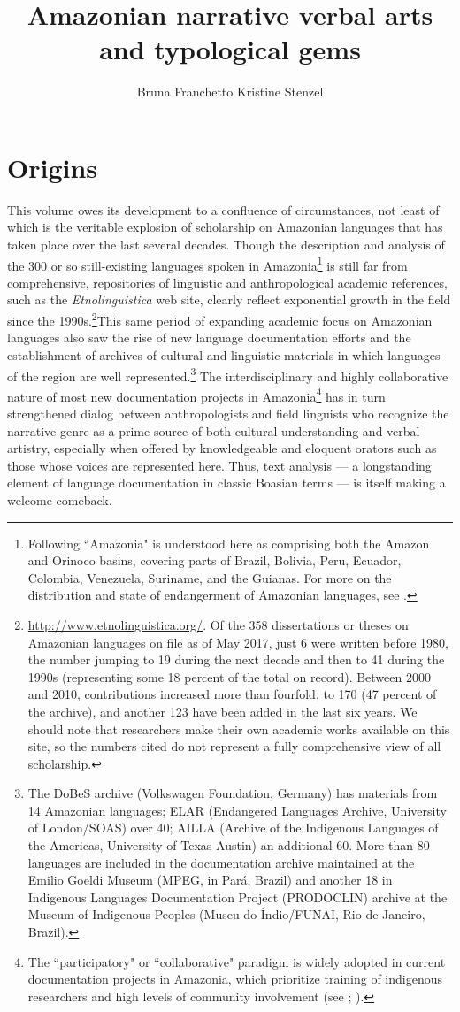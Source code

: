 \documentclass[output=paper,
modfonts,nonflat
]{langsci/langscibook}
\author{Bruna Franchetto\affiliation{Museu Nacional, Federal University of Rio de Janeiro, Brazil}\lastand 
Kristine Stenzel\affiliation{Federal University of Rio de Janeiro, Brazil}
}
\title{Amazonian narrative verbal arts and typological gems}
\begin{document}
  
\section{Origins}
This volume owes its development to a confluence of circumstances, not least of which is the veritable explosion of scholarship on Amazonian languages that has taken place over the last several decades. Though the description and analysis of the 300 or so still-existing languages spoken in Amazonia\footnote{Following \citealt{EppsSal2013} “Amazonia" is understood here as comprising both the Amazon and Orinoco basins, covering parts of Brazil, Bolivia, Peru, Ecuador, Colombia, Venezuela, Suriname, and the Guianas. For more on the distribution and state of endangerment of Amazonian languages, see \citealt{Moore2008}.} is still far from comprehensive, repositories of linguistic and anthropological academic references, such as the \textit{Etnolinguistica} web site, clearly reflect exponential growth in the field since the 1990s.\footnote{\url{http://www.etnolinguistica.org/}. Of the 358 dissertations or theses on Amazonian languages on file as of May 2017, just 6 were written before 1980, the number jumping to 19 during the next decade and then to 41 during the 1990s (representing some 18 percent of the total on record). Between 2000 and 2010, contributions increased more than fourfold, to 170 (47 percent of the archive), and another 123 have been added in the last six years. We should note that researchers make their own academic works available on this site, so the numbers cited do not represent a fully comprehensive view of all scholarship.}This same period of expanding academic focus on Amazonian languages also saw the rise of new language documentation efforts and the establishment of archives of cultural and linguistic materials in which languages of the region are well represented.\footnote{The DoBeS archive (Volkswagen Foundation, Germany) has materials from 14 Amazonian languages; ELAR (Endangered Languages Archive, University of London/SOAS) over 40; AILLA (Archive of the Indigenous Languages of the Americas, University of Texas Austin) an additional 60. More than 80 languages are included in the documentation archive maintained at the Emilio Goeldi Museum (MPEG, in Pará, Brazil) and another 18 in  Indigenous Languages Documentation Project (PRODOCLIN) archive at the Museum of Indigenous Peoples (Museu do Índio/FUNAI, Rio de Janeiro, Brazil).}
The interdisciplinary and highly collaborative nature of most new documentation projects in Amazonia\footnote{The “participatory" or “collaborative" paradigm is widely adopted in current documentation projects in Amazonia, which prioritize training of indigenous researchers and high levels of community involvement (see \citealt{Franchetto2014}; \citealt{Stenzel2014}).}
has in turn strengthened dialog between anthropologists and field linguists who recognize the narrative genre as a prime source of both cultural understanding and verbal artistry, especially when offered by knowledgeable and eloquent orators such as those whose voices are represented here. Thus, text analysis — a longstanding element of language documentation in classic Boasian terms — is itself making a welcome comeback.
 
\end{document}
